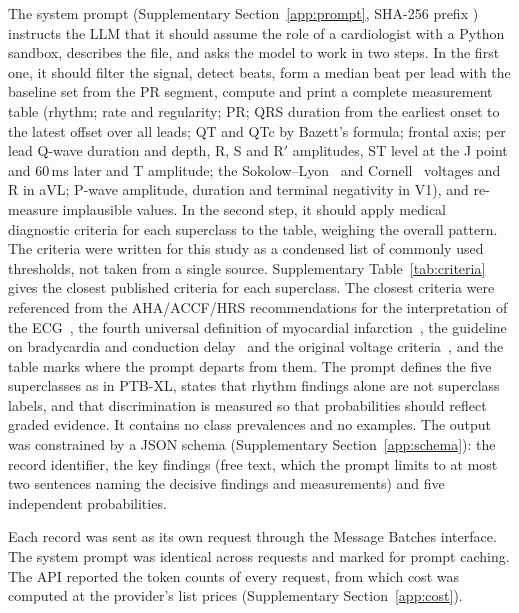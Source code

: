 The system prompt (Supplementary Section~\ref{app:prompt}, SHA-256 prefix \PromptSHA) instructs the
LLM that it should assume the role of a cardiologist with a Python sandbox, describes the file, and asks the model to
work in two steps. In the first one, it should filter the signal, detect beats, form a median beat per lead with the
baseline set from the PR segment, compute and print a complete measurement table (rhythm; rate and regularity; PR; QRS
duration from the earliest onset to the latest offset over all leads; QT and QTc by Bazett's formula; frontal axis;
per lead Q-wave duration
and depth, R, S and R$'$ amplitudes, ST level at the J point and 60\,ms later and T amplitude; the
Sokolow--Lyon~\citep{Sokolow1949} and Cornell~\citep{Casale1985,Casale1987} voltages and R in aVL; P-wave amplitude,
duration and terminal negativity in V1), and re-measure implausible values. In the second step, it should apply
medical diagnostic criteria for each superclass to the table, weighing the overall pattern. The criteria were written for this study as a condensed
list of commonly used thresholds, not taken from a single source. Supplementary Table~\ref{tab:criteria} gives the
closest published criteria for each superclass. The closest criteria were referenced from the AHA/ACCF/HRS recommendations for the interpretation of the
ECG~\citep{surawicz2009recommendations,rautaharju2009recommendations,hancock2009recommendations,wagner2009recommendations},
the fourth universal definition of myocardial infarction~\citep{thygesen2018fourth}, the guideline on bradycardia and
conduction delay~\citep{kusumoto2019bradycardia} and the original voltage criteria~\citep{Sokolow1949,Casale1985},
and the table marks where the prompt departs from them. The prompt defines the five superclasses as
in PTB-XL, states that rhythm findings alone are not superclass labels, and that discrimination is measured so
that probabilities should reflect graded evidence. It contains no class prevalences and no examples. The output was
constrained by a JSON schema (Supplementary Section~\ref{app:schema}): the record identifier, the key findings (free
text, which the prompt limits to at most two sentences naming the decisive findings and measurements) and five
independent probabilities.

Each record was sent as its own request through the Message Batches interface. The system prompt was identical across
requests and marked for prompt caching. The API reported the token counts of every request, from which cost was
computed at the provider's list prices (Supplementary Section~\ref{app:cost}).

